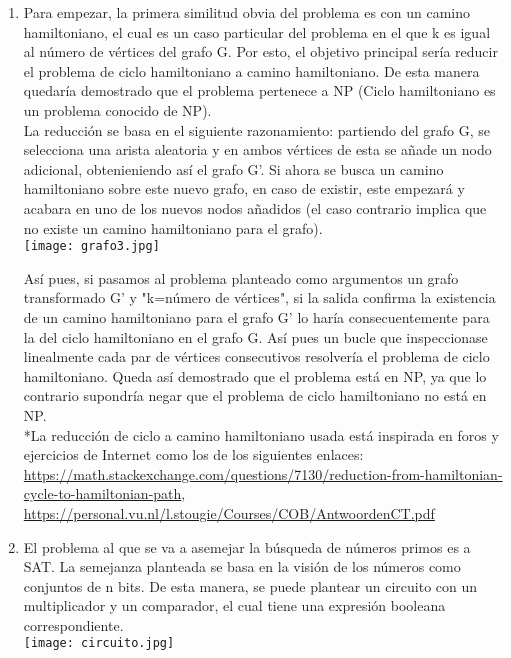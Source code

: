 \documentclass[10pt]{article}
\begin{document}
\begin{enumerate}

	\item Para empezar, la primera similitud obvia del problema es con un camino hamiltoniano, el cual es un caso particular del problema en el que k es igual al número de vértices del grafo G. Por esto, el objetivo principal sería reducir el problema de ciclo hamiltoniano a camino hamiltoniano. De esta manera quedaría demostrado que el problema pertenece a NP (Ciclo hamiltoniano es un problema conocido de NP).\\

	La reducción se basa en el siguiente razonamiento: partiendo del grafo G, se selecciona una arista aleatoria y en ambos vértices de esta se añade un nodo adicional, obtenieniendo así el grafo G'. Si ahora se busca un camino hamiltoniano sobre este nuevo grafo, en caso de existir, este empezará y acabara en uno de los nuevos nodos añadidos (el caso contrario implica que no existe un camino hamiltoniano para el grafo).\\
		\texttt{[image: grafo3.jpg]}

	Así pues, si pasamos al problema planteado como argumentos un grafo transformado G' y "k=número de vértices", si la salida confirma la existencia de un camino hamiltoniano para el grafo G' lo haría consecuentemente para la del ciclo hamiltoniano en el grafo G. Así pues un bucle que inspeccionase linealmente cada par de vértices consecutivos resolvería el problema de ciclo hamiltoniano. Queda así demostrado que el problema está en NP, ya que lo contrario supondría negar que el problema de ciclo hamiltoniano no está en NP.\\

	*La reducción de ciclo a camino hamiltoniano usada está inspirada en foros y ejercicios de Internet como los de los siguientes enlaces: \url{https://math.stackexchange.com/questions/7130/reduction-from-hamiltonian-cycle-to-hamiltonian-path}, \url{https://personal.vu.nl/l.stougie/Courses/COB/AntwoordenCT.pdf}\\

	\item El problema al que se va a asemejar la búsqueda de números primos es a SAT. La semejanza planteada se basa en la visión de los números como conjuntos de n bits. De esta manera, se puede plantear un circuito con un multiplicador y un comparador, el cual tiene una expresión booleana correspondiente.\\
		\texttt{[image: circuito.jpg]}


\end{enumerate}
\end{document}
